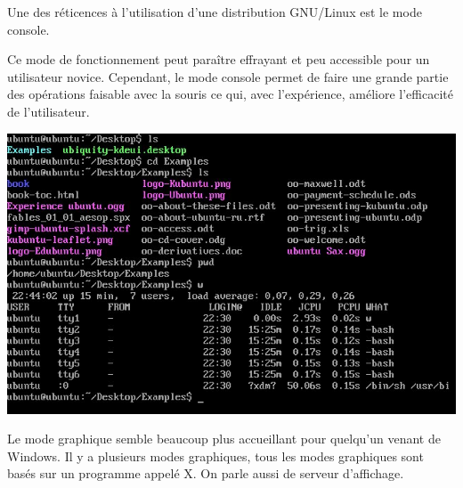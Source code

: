 \documentclass[10pt,fleqn]{article} %
\begin{document}
\begin{minipage}[c]{.49\linewidth}
Une des réticences à l'utilisation d'une distribution GNU/Linux est le mode console. 

Ce mode de fonctionnement peut paraître effrayant et peu accessible pour un utilisateur novice. Cependant, le mode console permet de faire une grande partie des opérations faisable avec la souris ce qui, avec l'expérience, améliore l'efficacité de l'utilisateur.
\end{minipage} \hfill
\begin{minipage}[c]{.49\linewidth}
\begin{center}
\includegraphics[width=.9\textwidth]{images/commande.jpg}
\end{center}
\end{minipage}
%
%


\vspace{.25cm}

Le mode graphique semble beaucoup plus accueillant pour quelqu'un venant de Windows. 
Il y a plusieurs modes graphiques, tous les modes graphiques sont basés sur un programme appelé X. On parle aussi de serveur d'affichage.
\end{document}
